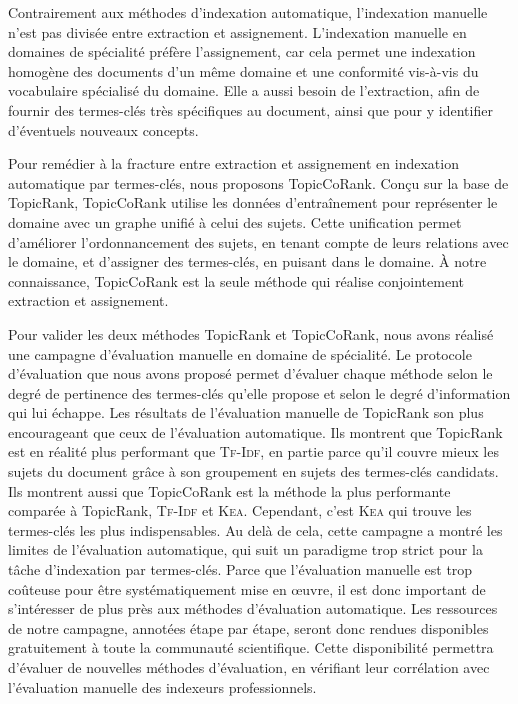     Contrairement aux méthodes d'indexation automatique, l'indexation manuelle
    n'est pas divisée entre extraction et assignement. L'indexation manuelle en
    domaines de spécialité préfère l'assignement, car cela permet une
    indexation homogène des documents d'un même domaine et une conformité
    vis-à-vis du vocabulaire spécialisé du domaine. Elle a aussi besoin de
    l'extraction, afin de fournir des termes-clés très spécifiques au document,
    ainsi que pour y identifier d'éventuels nouveaux concepts.

    Pour remédier à la fracture entre extraction et assignement en indexation
    automatique par termes-clés, nous proposons TopicCoRank. Conçu sur la base
    de TopicRank, TopicCoRank utilise les données d'entraînement pour
    représenter le domaine avec un graphe unifié à celui des sujets. Cette
    unification permet d'améliorer l'ordonnancement des sujets, en tenant compte
    de leurs relations avec le domaine, et d'assigner des termes-clés, en
    puisant dans le domaine. À notre connaissance, TopicCoRank est la seule
    méthode qui réalise conjointement extraction et assignement.

    Pour valider les deux méthodes TopicRank et TopicCoRank, nous avons réalisé
    une campagne d'évaluation manuelle en domaine de spécialité. Le protocole
    d'évaluation que nous avons proposé permet d'évaluer chaque méthode selon le
    degré de pertinence des termes-clés qu'elle propose et selon le degré
    d'information qui lui échappe. Les résultats de l'évaluation manuelle de
    TopicRank son plus encourageant que ceux de l'évaluation automatique. Ils
    montrent que TopicRank est en réalité plus performant que \textsc{Tf-Idf},
    en partie parce qu'il couvre mieux les sujets du document grâce à son
    groupement en sujets des termes-clés candidats.
    Ils montrent aussi que TopicCoRank est la méthode la plus performante
    comparée à TopicRank, \textsc{Tf-Idf} et \textsc{Kea}. Cependant, c'est
    \textsc{Kea} qui trouve les termes-clés les plus indispensables.
    Au delà de cela, cette
    campagne a montré les limites de l'évaluation automatique, qui suit un
    paradigme trop strict pour la tâche d'indexation par termes-clés. Parce que
    l'évaluation manuelle est trop coûteuse pour être systématiquement mise en
    \oe{}uvre, il est donc important de s'intéresser de plus près aux méthodes
    d'évaluation automatique. Les ressources de notre campagne, annotées étape
    par étape, seront donc
    rendues disponibles gratuitement à toute la communauté scientifique. Cette
    disponibilité permettra d'évaluer de nouvelles méthodes d'évaluation, en
    vérifiant leur corrélation avec l'évaluation manuelle des indexeurs
    professionnels.

